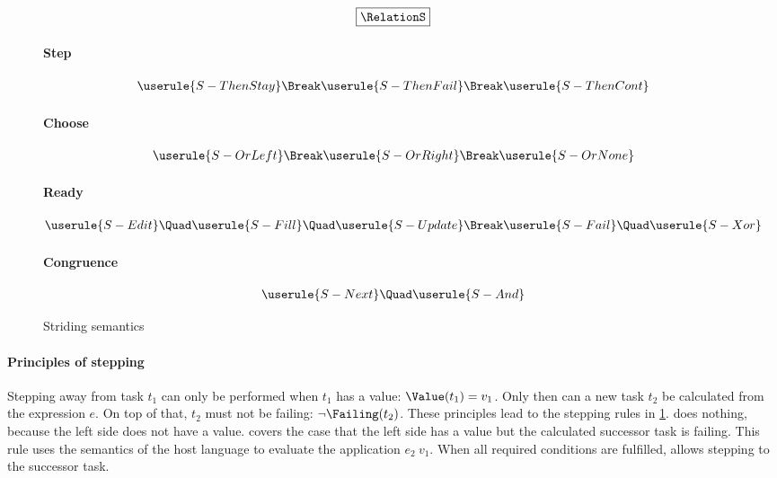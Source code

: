 \begin{figure}[h]
  \small

  \begin{gather*}
    \boxed{\RelationS}
  \end{gather*}

  \paragraph{Step}
  \begin{gather*}
    \userule{S-ThenStay} \Break
    \userule{S-ThenFail} \Break
    \userule{S-ThenCont}
  \end{gather*}

  \paragraph{Choose}
  \begin{gather*}
    \userule{S-OrLeft} \Break
    \userule{S-OrRight} \Break
    \userule{S-OrNone}
  \end{gather*}

  \paragraph{Ready}
  \begin{gather*}
    \userule{S-Edit} \Quad \userule{S-Fill} \Quad \userule{S-Update} \Break
    \userule{S-Fail} \Quad \userule{S-Xor}
  \end{gather*}

  \paragraph{Congruence}
  \begin{gather*}
    \userule{S-Next} \Quad
    \userule{S-And}
  \end{gather*}

  \caption{Striding semantics} \label{fig:striding-semantics}
\end{figure}



\paragraph{Principles of stepping}
\label{sub:stepping-principles}

Stepping away from task $t_1$ can only be performed when
$t_1$ has a value: $\Value(t_1) = v_1$.
Only then can a new task $t_2$ be calculated from the expression $e$.
On top of that, $t_2$ must not be failing: $\neg\Failing(t_2)$.
%
These principles lead to the stepping rules in \cref{fig:striding-semantics}.
 does nothing,
because the left side does not have a value.
 covers the case that
the left side has a value but the calculated successor task is failing.
This rule uses the semantics of the host language to evaluate the application $e_2\ v_1$.
When all required conditions are fulfilled,  allows stepping to the successor task.



